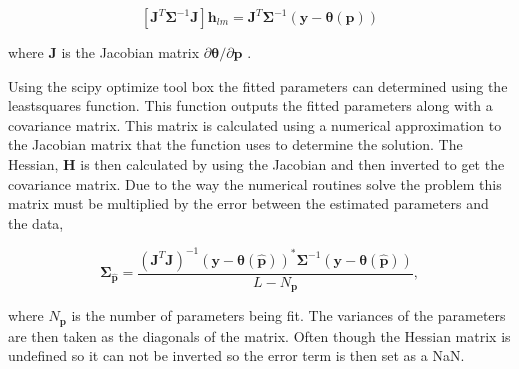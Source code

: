\documentclass[10pt]{report}
\begin{document}
\begin{equation}
\left[ \mathbf{J}^T\bm{\Sigma}^{-1}\mathbf{J}\right]\mathbf{h}_{lm} =\mathbf{J}^T\bm{\Sigma}^{-1}(\mathbf{y}-\bm{\theta}(\mathbf{p}))
\label{hlm}
\end{equation}

\noindent where $\mathbf{J}$ is the Jacobian matrix $\partial \bm{\theta}/\partial \mathbf{p}$ \cite{levenberg1944} \cite{marquardt:1963}. 

Using the scipy optimize tool box the fitted parameters can determined using the leastsquares function. This function outputs the fitted parameters along with a covariance matrix. This matrix is calculated using a numerical approximation to the Jacobian matrix that the function uses to determine the solution. The Hessian, $\mathbf{H}$ is then calculated by using the Jacobian and then inverted to get the covariance matrix. Due to the way the numerical routines solve the problem this matrix must be multiplied by the error between the estimated parameters and the data,

\begin{equation}
\label{eqn:jacinv}
\bm{\Sigma}_{\hat{\mathbf{p}}}=\frac{(\mathbf{J}^T\mathbf{J})^{-1} (\mathbf{y}-\bm{\theta}(\hat{\mathbf{p}}))^*\bm{\Sigma}^{-1}(\mathbf{y}-\bm{\theta}(\hat{\mathbf{p}}))}{L-N_{\mathbf{p}}},
\end{equation}

\noindent where $N_{\mathbf{p}}$ is the number of parameters being fit. The variances of the parameters are then taken as the diagonals of the matrix. Often though the Hessian matrix is undefined so it can not be inverted so the error term is then set as a NaN.

 

 

 
\end{document}

